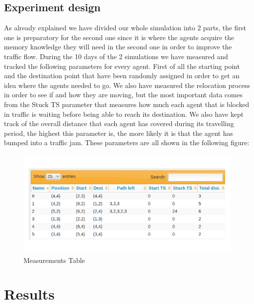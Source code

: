 \documentclass[a4paper,hidelinks]{article}
\begin{document}
\subsection{Experiment design}

As already explained we have divided our whole simulation into 2 parts, the first one is preparatory for the second one since it is where the agents acquire the memory knowledge they will need in the second one in order to improve the traffic flow. During the 10 days of the 2 simulations we have measured and tracked the following parameters for every agent. First of all the starting point and the destination point that have been randomly assigned in order to get an idea where the agents needed to go. We also have measured the relocation process in order to see if and how they are moving, but the most important data comes from the Stuck TS parameter that measures how much each agent that is blocked in traffic is waiting before being able to reach its destination. We also have kept track of the overall distance that each agent has covered during its travelling period, the highest this parameter is, the more likely it is that the agent has bumped into a traffic jam. These parameters are all shown in the following figure:

\begin{figure}[ht!]
\centering
\includegraphics[width = 1.0\linewidth]{data}
\caption{Measurements Table \label{overflow}}
\end{figure} 


\section{Results}
\end{document}
